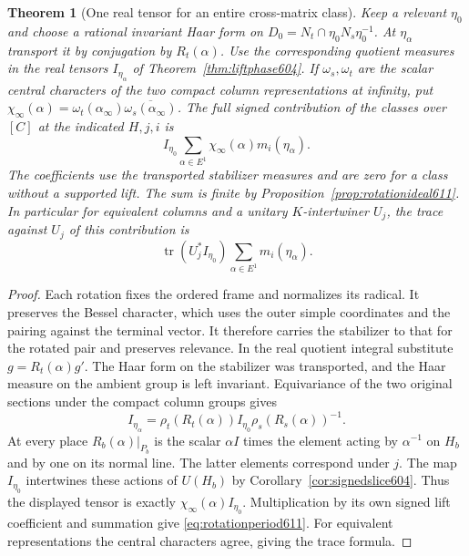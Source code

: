 \documentclass[a4paper,11pt]{article}
\newtheorem{theorem}[proposition]{Theorem}
\theoremstyle{definition}
\theoremstyle{remark}
\numberwithin{equation}{section}
\begin{document}
\begin{theorem}[One real tensor for an entire cross-matrix class]
\leavevmode\label{thm:rotationperiod611}
Keep a relevant \(\eta_0\) and choose a rational invariant Haar
form on \(D_0=N_t\cap\eta_0N_s\eta_0^{-1}\). At \(\eta_\alpha\)
transport it by conjugation by \(R_t(\alpha)\). Use the
corresponding quotient measures in the real tensors
\(I_{\eta_\alpha}\) of Theorem~\ref{thm:liftphase604}. If
\(\omega_s,\omega_t\) are the scalar central characters of the
two compact column representations at infinity, put
\(\chi_\infty(\alpha)=\omega_t(\alpha_\infty)
                         \overline{\omega_s(\alpha_\infty)}\).
The full signed contribution of the classes over \([C]\) at
the indicated \(H,j,i\) is
\begin{equation}
      I_{\eta_0}\sum_{\alpha\in E^1}
                    \chi_\infty(\alpha)m_i(\eta_\alpha).
 \label{eq:rotationperiod611}
\end{equation}
The coefficients use the transported stabilizer measures and are
zero for a class without a supported lift. The sum is finite by
Proposition~\ref{prop:rotationideal611}. In particular for
equivalent columns and a unitary \(K\)-intertwiner \(U_j\), the
trace against \(U_j\) of this contribution is
\[
       \operatorname{tr}(U_j^*I_{\eta_0})\sum_{\alpha\in E^1}
                                                 m_i(\eta_\alpha).
\]
\end{theorem}
\begin{proof}
Each rotation fixes the ordered frame and normalizes its radical.
It preserves the Bessel character, which uses the outer simple
coordinates and the pairing against the terminal vector. It
therefore carries the stabilizer to that for the rotated pair
and preserves relevance. In the real quotient integral substitute
\(g=R_t(\alpha)g'\). The Haar form on the stabilizer was transported,
and the Haar measure on the ambient group is left invariant.
Equivariance of the two original sections under the compact
column groups gives
\[
 I_{\eta_\alpha}
       =\rho_t(R_t(\alpha)) I_{\eta_0}\rho_s(R_s(\alpha))^{-1}.
\]
At every place \(R_b(\alpha)|_{P_b}\) is the scalar \(\alpha I\)
times the element acting by \(\alpha^{-1}\) on \(H_b\) and by one
on its normal line. The latter elements correspond under \(j\).
The map \(I_{\eta_0}\) intertwines these actions of \(U(H_b)\)
by Corollary~\ref{cor:signedslice604}. Thus the displayed tensor
is exactly \(\chi_\infty(\alpha)I_{\eta_0}\). Multiplication by
its own signed lift coefficient and summation give
\eqref{eq:rotationperiod611}. For equivalent representations
the central characters agree, giving the trace formula.
\end{proof}
\end{document}
